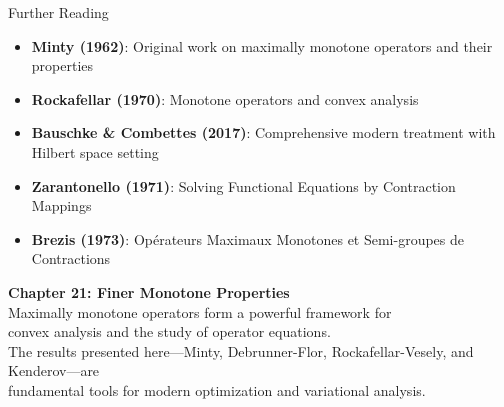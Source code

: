 \documentclass[aspectratio=169,10pt]{beamer}
\begin{document}
\begin{frame}{Further Reading}
    \begin{itemize}
        \item \textbf{Minty (1962)}: Original work on maximally monotone operators and their properties

        \item \textbf{Rockafellar (1970)}: Monotone operators and convex analysis

        \item \textbf{Bauschke \& Combettes (2017)}: Comprehensive modern treatment with
              Hilbert space setting

        \item \textbf{Zarantonello (1971)}: Solving Functional Equations by Contraction Mappings

        \item \textbf{Brezis (1973)}: Opérateurs Maximaux Monotones et Semi-groupes de Contractions
    \end{itemize}
\end{frame}

\begin{frame}[plain]
    \begin{center}
        \Large
        \textbf{Chapter 21: Finer Monotone Properties} \\[1em]
        \normalsize
        Maximally monotone operators form a powerful framework for\\
        convex analysis and the study of operator equations.\\[2em]

        The results presented here—Minty, Debrunner-Flor, Rockafellar-Vesely,
        and Kenderov—are\\
        fundamental tools for modern optimization and variational analysis.
    \end{center}
\end{frame}
\end{document}
